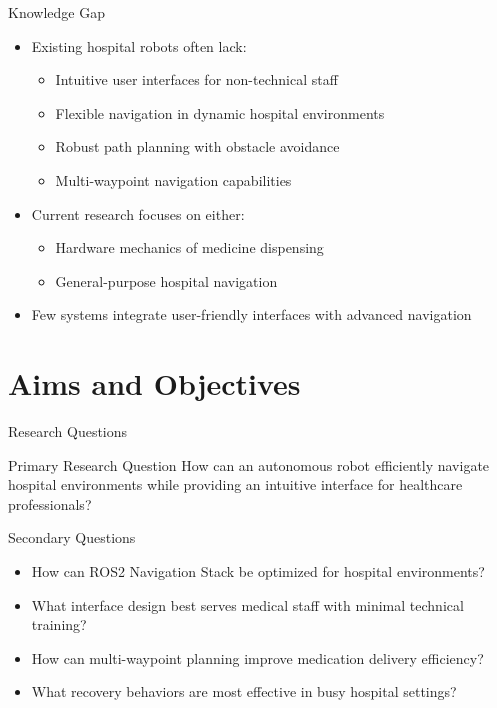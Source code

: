 \documentclass[aspectratio=169]{beamer}
\newcommand{\reducefontsize}{\fontsize{7}{9}\selectfont}
\begin{document}
\begin{frame}{Knowledge Gap}
  \begin{itemize}
  \item Existing hospital robots often lack:
    \begin{itemize}
    \item Intuitive user interfaces for non-technical staff
    \item Flexible navigation in dynamic hospital environments
    \item Robust path planning with obstacle avoidance
    \item Multi-waypoint navigation capabilities
    \end{itemize}
  \item Current research focuses on either:
    \begin{itemize}
    \item Hardware mechanics of medicine dispensing
    \item General-purpose hospital navigation
    \end{itemize}
  \item Few systems integrate user-friendly interfaces with advanced navigation
  \end{itemize}
\end{frame}

\section{Aims and Objectives}

\begin{frame}{Research Questions}
  \begin{alertblock}{Primary Research Question}
    How can an autonomous robot efficiently navigate hospital environments while providing an intuitive interface for healthcare professionals?
  \end{alertblock}
      {\reducefontsize    
        \begin{block}{Secondary Questions}
          \begin{itemize}
          \item How can ROS2 Navigation Stack be optimized for hospital environments?
          \item What interface design best serves medical staff with minimal technical training?
          \item How can multi-waypoint planning improve medication delivery efficiency?
          \item What recovery behaviors are most effective in busy hospital settings?
          \end{itemize}
        \end{block}
      }
\end{frame}
\end{document}
